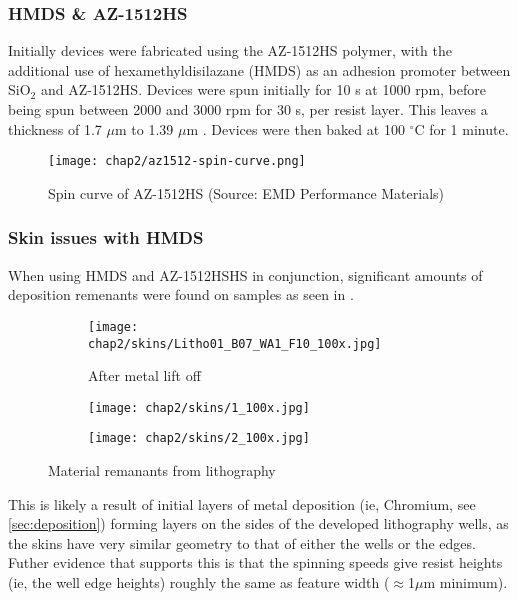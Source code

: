\documentclass[../Matt_Gebert_Honours_Thesis.tex]{subfiles}
\begin{document}
	\subsubsection{HMDS \& AZ-1512HS}
		Initially devices were fabricated using the AZ-1512HS polymer, with the additional use of hexamethyldisilazane (HMDS) as an adhesion promoter between SiO$_2$ and AZ-1512HS. Devices were spun initially for 10 s at 1000 rpm, before being spun between 2000 and 3000 rpm for 30 s, per resist layer. This leaves a thickness of 1.7 $\mu$m to 1.39 $\mu$m \cite{az1500_series}.
		Devices were then baked at 100 $^\circ$C for 1 minute.
	
	\begin{figure}[H]\label{fig:spin_curve_AZ-1512HS}
		\centering
		\texttt{[image: chap2/az1512-spin-curve.png]}
		\caption{Spin curve of AZ-1512HS (Source: EMD Performance Materials\cite{az1500_series_spincurve})}
	\end{figure}
	
	\subsubsection{Skin issues with HMDS}\label{sec:sin_issues}
	When using HMDS and AZ-1512HSHS in conjunction, significant amounts of deposition remenants were found on samples as seen in .%
	
	\begin{figure}[H]
		\centering
		\begin{subfigure}[b]{0.3\textwidth}
			\texttt{[image: chap2/skins/Litho01\_B07\_WA1\_F10\_100x.jpg]}
			\caption{After metal lift off}			
		\end{subfigure}
		\begin{subfigure}[b]{0.3\textwidth}
			\texttt{[image: chap2/skins/1\_100x.jpg]}
		\end{subfigure}
		\begin{subfigure}[b]{0.3\textwidth}
			\texttt{[image: chap2/skins/2\_100x.jpg]}
		\end{subfigure}
		\caption{Material remanants from lithography}\label{fig:lithography_skins}
	\end{figure}
	
	This is likely a result of initial layers of metal deposition (ie, Chromium, see \cref{sec:deposition}) forming layers on the sides of the developed lithography wells, as the skins have very similar geometry to that of either the wells or the edges. Futher evidence that supports this is that the spinning speeds give resist heights (ie, the well edge heights) roughly the same as feature width ($\approx$1$\mu$m minimum).
	
\end{document}
